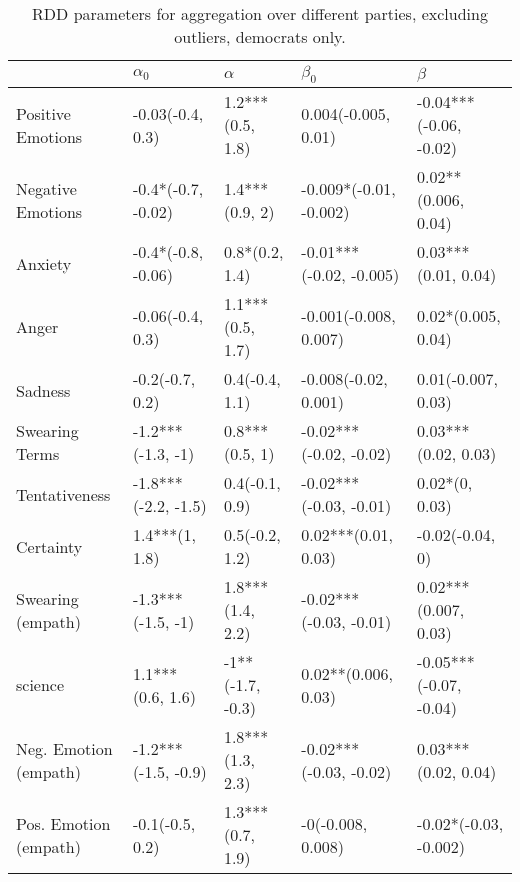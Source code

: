 \begin{table}[h]\centering
\begin{adjustbox}{width=\linewidth, center}
	\begin{tabular}{lllll}
	\toprule
	{} &           $\alpha_0$ &          $\alpha$ &                $\beta_0$ &                 $\beta$ \\
	\midrule
	Positive Emotions     &     -0.03(-0.4, 0.3) &  1.2***(0.5, 1.8) &      0.004(-0.005, 0.01) &  -0.04***(-0.06, -0.02) \\
	Negative Emotions     &   -0.4*(-0.7, -0.02) &    1.4***(0.9, 2) &   -0.009*(-0.01, -0.002) &     0.02**(0.006, 0.04) \\
	Anxiety               &   -0.4*(-0.8, -0.06) &    0.8*(0.2, 1.4) &  -0.01***(-0.02, -0.005) &     0.03***(0.01, 0.04) \\
	Anger                 &     -0.06(-0.4, 0.3) &  1.1***(0.5, 1.7) &    -0.001(-0.008, 0.007) &      0.02*(0.005, 0.04) \\
	Sadness               &      -0.2(-0.7, 0.2) &    0.4(-0.4, 1.1) &     -0.008(-0.02, 0.001) &      0.01(-0.007, 0.03) \\
	Swearing Terms        &    -1.2***(-1.3, -1) &    0.8***(0.5, 1) &   -0.02***(-0.02, -0.02) &     0.03***(0.02, 0.03) \\
	Tentativeness         &  -1.8***(-2.2, -1.5) &    0.4(-0.1, 0.9) &   -0.02***(-0.03, -0.01) &          0.02*(0, 0.03) \\
	Certainty             &       1.4***(1, 1.8) &    0.5(-0.2, 1.2) &      0.02***(0.01, 0.03) &         -0.02(-0.04, 0) \\
	Swearing (empath)     &    -1.3***(-1.5, -1) &  1.8***(1.4, 2.2) &   -0.02***(-0.03, -0.01) &    0.02***(0.007, 0.03) \\
	science               &     1.1***(0.6, 1.6) &  -1**(-1.7, -0.3) &      0.02**(0.006, 0.03) &  -0.05***(-0.07, -0.04) \\
	Neg. Emotion (empath) &  -1.2***(-1.5, -0.9) &  1.8***(1.3, 2.3) &   -0.02***(-0.03, -0.02) &     0.03***(0.02, 0.04) \\
	Pos. Emotion (empath) &      -0.1(-0.5, 0.2) &  1.3***(0.7, 1.9) &        -0(-0.008, 0.008) &   -0.02*(-0.03, -0.002) \\
	\bottomrule
	\end{tabular}
	
\end{adjustbox}
	\caption{RDD parameters for aggregation over different parties, excluding outliers, democrats only.}
	\label{fig: Party_2}
\end{table}


